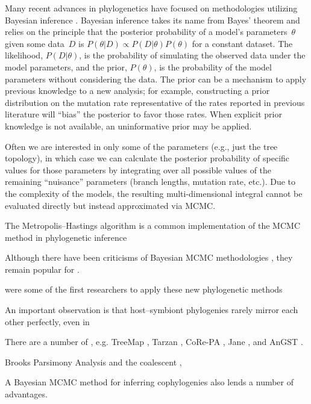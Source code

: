 \documentclass[12pt,letterpaper]{article}
\begin{document}
Many recent advances in phylogenetics have focused on methodologies utilizing Bayesian inference \parencites{Ronquist:2012}{Drummond:2012}. Bayesian inference takes its name from Bayes' theorem \parencite{Bayes:1763} and relies on the principle that the posterior probability of a model's parameters~$\theta$ given some data~$D$ is $P\left(\theta|D\right) \propto P\left(D|\theta\right) P\left(\theta\right)$ for a constant dataset. The likelihood, $P\left(D|\theta\right)$, is the probability of simulating the observed data under the model parameters, and the prior, $P\left(\theta\right)$, is the probability of the model parameters without considering the data. The prior can be a mechanism to apply previous knowledge to a new analysis; for example, constructing a prior distribution on the mutation rate representative of the rates reported in previous literature will \enquote{bias} the posterior to favor those rates. When explicit prior knowledge is not available, an uninformative prior may be applied.

Often we are interested in only some of the parameters (e.g., just the tree topology), in which case we can calculate the posterior probability of specific values for those parameters by integrating over all possible values of the remaining \enquote{nuisance} parameters (branch lengths, mutation rate, etc.). Due to the complexity of the models, the resulting multi-dimensional integral cannot be evaluated directly but instead approximated via \ac{MCMC}.

The Metropolis--Hastings algorithm \parencites{Metropolis:1953}{Hastings:1970} is a common implementation of the \ac{MCMC} method in phylogenetic inference

Although there have been criticisms of Bayesian \ac{MCMC} methodologies \parencites{Felsenstein:2005}{Kolaczkowski:2009}, they remain popular for \parencite{}.

\textcite{Haffner:1988} were some of the first researchers to apply these new phylogenetic methods 

An important observation is that host--symbiont phylogenies rarely mirror each other perfectly, even in 

There are a number of , e.g. TreeMap \parencite{}, Tarzan \parencite{Merkle:2005}, CoRe-PA \parencite{Merkle:2010}, Jane \parencite{Conow:2010}, and AnGST \parencite{David:2011}.

Brooks Parsimony Analysis \parencite{Brooks:1981} and the coalescent \parencite{Rannala:2003} , 

A Bayesian \ac{MCMC} method for inferring cophylogenies also lends a number of advantages.
\end{document}
